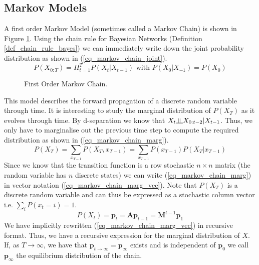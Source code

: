\subsection{Markov Models}
A first order Markov Model (sometimes called a Markov Chain) is shown in Figure \ref{fig_markov_chain}. Using the chain rule for Bayesian Networks (Definition \ref{def_chain_rule_bayes}) we can immediately write down the joint probability distribution as shown in (\ref{eq_markov_chain_joint}).
\begin{equation}
P(X_{0:T}) = \Pi_{t=1}^T P(X_t|X_{t-1}) \text{ with } P(X_0|X_{-1}) = P(X_0)
\label{eq_markov_chain_joint}
\end{equation}  
\begin{figure}[H] 
\centering
{}
\caption{First Order Markov Chain.}
\label{fig_markov_chain}
\end{figure}
This model describes the forward propagation of a discrete random variable through time. It is interesting to study the marginal distribution of $P(X_T)$ as it evolves through time. By d-separation we know that $X_t \indep X_{0:t-2} | X_{t-1}$. Thus, we only have to marginalise out the previous time step to compute the required distribution as shown in (\ref{eq_markov_chain_marg}).
\begin{equation}
P(X_T) = \sum_{x_{T-1}} P(X_T, x_{T-1}) = \sum_{x_{T-1}} P(x_{T-1})P(X_T|x_{T-1})
\label{eq_markov_chain_marg}
\end{equation}
Since we know that the transition function is a row stochastic $n \times n$ matrix (the random variable has $n$ discrete states) we can write (\ref{eq_markov_chain_marg}) in vector notation (\ref{eq_markov_chain_marg_vec}). Note that $P(X_T)$ is a discrete random variable and can thus be expressed as a stochastic column vector i.e. $\sum_i P(x_t=i) = 1$.
\begin{equation}
P(X_t) = \mathbf{p}_t = \mathbf{A}\mathbf{p}_{t-1} = \mathbf{M}^{t-1}\mathbf{p}_1
\label{eq_markov_chain_marg_vec}
\end{equation}
We have implicitly rewritten (\ref{eq_markov_chain_marg_vec}) in recursive format. Thus, we have a recursive expression for the marginal distribution of $X$. If, as $T \rightarrow \infty$, we have that $\mathbf{p}_{t \rightarrow \infty} = \mathbf{p}_{\infty}$ exists and is independent of $\mathbf{p}_0$ we call $\mathbf{p}_{\infty}$ the equilibrium distribution of the chain. 

